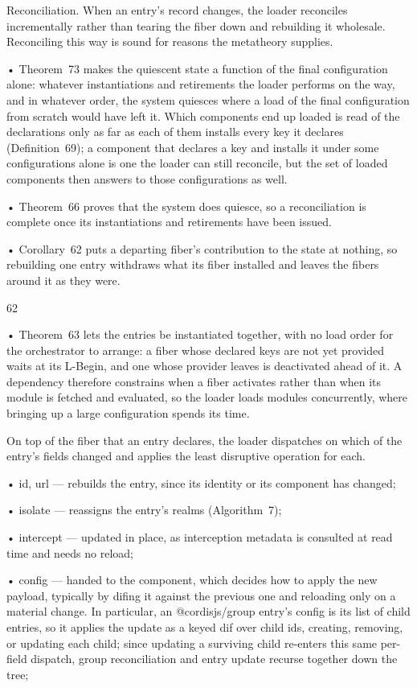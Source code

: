 \documentclass[
  10
]{article}
\begin{document}
Reconciliation. When an entry's record changes, the loader reconciles
incrementally rather than tearing the fiber down and rebuilding it
wholesale. Reconciling this way is sound for reasons the metatheory
supplies.

• Theorem~73 makes the quiescent state a function of the final
configuration alone: whatever instantiations and retirements the loader
performs on the way, and in whatever order, the system quiesces where a
load of the final configuration from scratch would have left it. Which
components end up loaded is read of the declarations only as far as each
of them installs every key it declares (Definition~69); a component that
declares a key and installs it under some configurations alone is one
the loader can still reconcile, but the set of loaded components then
answers to those configurations as well.

• Theorem~66 proves that the system does quiesce, so a reconciliation is
complete once its instantiations and retirements have been issued.

• Corollary~62 puts a departing fiber's contribution to the state at
nothing, so rebuilding one entry withdraws what its fiber installed and
leaves the fibers around it as they were.

62

• Theorem~63 lets the entries be instantiated together, with no load
order for the orchestrator to arrange: a fiber whose declared keys are
not yet provided waits at its L-Begin, and one whose provider leaves is
deactivated ahead of it. A dependency therefore constrains when a fiber
activates rather than when its module is fetched and evaluated, so the
loader loads modules concurrently, where bringing up a large
configuration spends its time.

On top of the fiber that an entry declares, the loader dispatches on
which of the entry's fields changed and applies the least disruptive
operation for each.

• id, url --- rebuilds the entry, since its identity or its component
has changed;

• isolate --- reassigns the entry's realms (Algorithm~7);

• intercept --- updated in place, as interception metadata is consulted
at read time and needs no reload;

• config --- handed to the component, which decides how to apply the new
payload, typically by difing it against the previous one and reloading
only on a material change. In particular, an @cordisjs/group entry's
config is its list of child entries, so it applies the update as a keyed
dif over child ids, creating, removing, or updating each child; since
updating a surviving child re-enters this same per-field dispatch, group
reconciliation and entry update recurse together down the tree;
\end{document}
